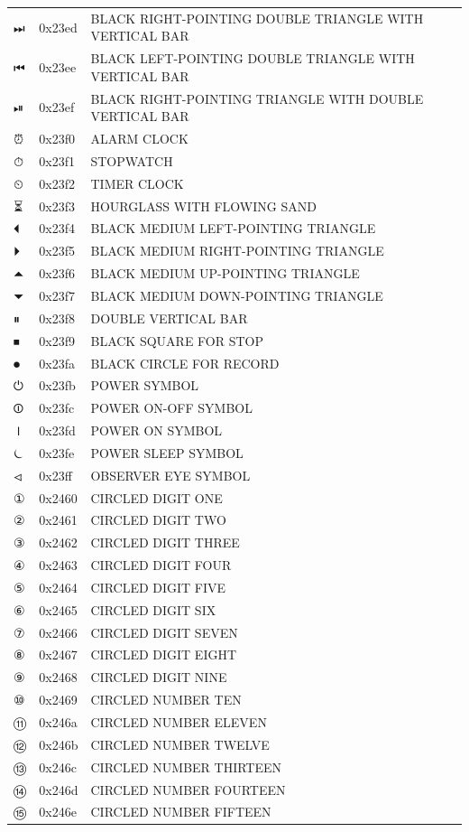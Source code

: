 \documentclass[12pt, twoside]{article}
\begin{document}
\begin{longtable}{L{1.0cm} L{2.0cm} >{\footnotesize}L{10cm}}
$⏭$&0x23ed&BLACK RIGHT-POINTING DOUBLE TRIANGLE WITH VERTICAL BAR\\
$⏮$&0x23ee&BLACK LEFT-POINTING DOUBLE TRIANGLE WITH VERTICAL BAR\\
$⏯$&0x23ef&BLACK RIGHT-POINTING TRIANGLE WITH DOUBLE VERTICAL BAR\\
$⏰$&0x23f0&ALARM CLOCK\\
$⏱$&0x23f1&STOPWATCH\\
$⏲$&0x23f2&TIMER CLOCK\\
$⏳$&0x23f3&HOURGLASS WITH FLOWING SAND\\
$⏴$&0x23f4&BLACK MEDIUM LEFT-POINTING TRIANGLE\\
$⏵$&0x23f5&BLACK MEDIUM RIGHT-POINTING TRIANGLE\\
$⏶$&0x23f6&BLACK MEDIUM UP-POINTING TRIANGLE\\
$⏷$&0x23f7&BLACK MEDIUM DOWN-POINTING TRIANGLE\\
$⏸$&0x23f8&DOUBLE VERTICAL BAR\\
$⏹$&0x23f9&BLACK SQUARE FOR STOP\\
$⏺$&0x23fa&BLACK CIRCLE FOR RECORD\\
$⏻$&0x23fb&POWER SYMBOL\\
$⏼$&0x23fc&POWER ON-OFF SYMBOL\\
$⏽$&0x23fd&POWER ON SYMBOL\\
$⏾$&0x23fe&POWER SLEEP SYMBOL\\
$⏿$&0x23ff&OBSERVER EYE SYMBOL\\
$①$&0x2460&CIRCLED DIGIT ONE\\
$②$&0x2461&CIRCLED DIGIT TWO\\
$③$&0x2462&CIRCLED DIGIT THREE\\
$④$&0x2463&CIRCLED DIGIT FOUR\\
$⑤$&0x2464&CIRCLED DIGIT FIVE\\
$⑥$&0x2465&CIRCLED DIGIT SIX\\
$⑦$&0x2466&CIRCLED DIGIT SEVEN\\
$⑧$&0x2467&CIRCLED DIGIT EIGHT\\
$⑨$&0x2468&CIRCLED DIGIT NINE\\
$⑩$&0x2469&CIRCLED NUMBER TEN\\
$⑪$&0x246a&CIRCLED NUMBER ELEVEN\\
$⑫$&0x246b&CIRCLED NUMBER TWELVE\\
$⑬$&0x246c&CIRCLED NUMBER THIRTEEN\\
$⑭$&0x246d&CIRCLED NUMBER FOURTEEN\\
$⑮$&0x246e&CIRCLED NUMBER FIFTEEN\\

\end{longtable}
\end{document}
